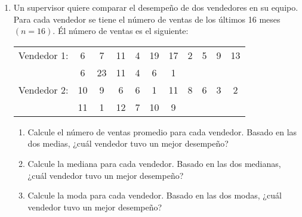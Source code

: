 \documentclass[letterpaper]{article}
\begin{document}
\begin{enumerate}
	\item Un supervisor quiere comparar el desempeño de dos vendedores en su equipo. Para cada vendedor se tiene el número de ventas de los últimos 16 meses $(n=16)$. Él número de ventas es el siguiente:
	\begin{table}[H]
		\centering
		\begin{tabular}{lcccccccccc}
			Vendedor 1:& 6 & 7&  11&  4&  19&  17&  2&  5&  9&  13 \\
			& 6&  23&  11&  4&  6&  1&  &  &  &     \\
			Vendedor 2:&  10&  9&  6&  6&  1&   11&  8&  6&  3&  2 \\
			& 11& 1&  12&  7&  10&  9 & & & & 
		\end{tabular}
	\end{table}
	\begin{enumerate}
		\item Calcule el número de ventas promedio para cada vendedor. Basado en las dos medias, ¿cuál vendedor tuvo un mejor desempeño?
		\item Calcule la mediana para cada vendedor. Basado en las dos medianas, ¿cuál vendedor tuvo un mejor desempeño?
		\item Calcule la moda para cada vendedor. Basado en las dos modas, ¿cuál vendedor tuvo un mejor desempeño?
	\end{enumerate}
	
\end{enumerate}
\end{document}
